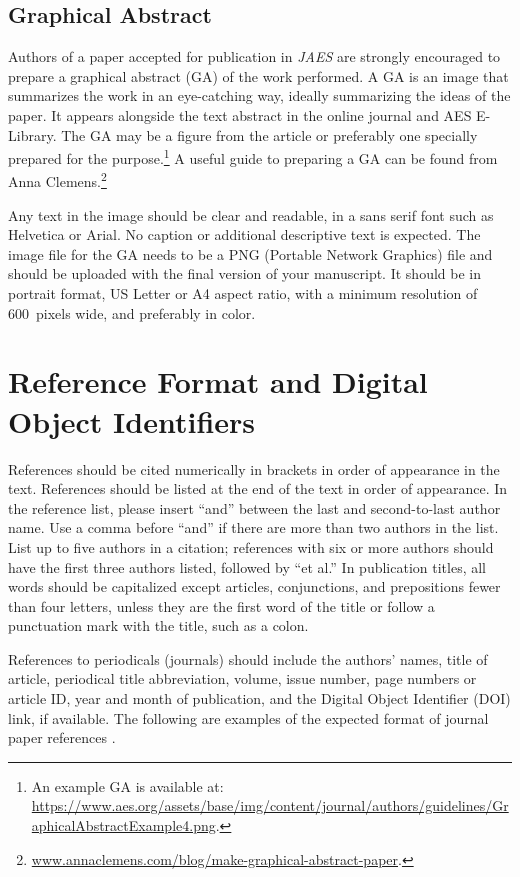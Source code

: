 \documentclass[fleqn]{jaes}
\begin{document}
\subsection{Graphical Abstract}
Authors of a paper accepted for publication in \emph{JAES} are strongly encouraged to prepare a graphical abstract (GA) of the work performed. A GA is an image that summarizes the work in an eye-catching way, ideally summarizing the ideas of the paper. It appears alongside the text abstract in the online journal and AES E-Library. The GA may be a figure from the article or preferably one specially prepared for the purpose.\footnote{An example GA is available at: \url{https://www.aes.org/assets/base/img/content/journal/authors/guidelines/GraphicalAbstractExample4.png}.} A useful guide to preparing a GA can be found from Anna Clemens.\footnote{\url{www.annaclemens.com/blog/make-graphical-abstract-paper}.}

Any text in the image should be clear and readable, in a sans serif font such as Helvetica or Arial. No caption or additional descriptive text is expected. The image file for the GA needs to be a PNG (Portable Network Graphics) file and should be uploaded with the final version of your manuscript. It should be in portrait format, US Letter or A4 aspect ratio, with a minimum resolution of 600~pixels wide, and preferably in color.

\section{Reference Format and Digital Object Identifiers}\label{sec:refs}
References should be cited numerically in brackets in order of appearance in the text. References should be listed at the end of the text in order of appearance. In the reference list, please insert “and” between the last and second-to-last author name. Use a comma before “and” if there are more than two authors in the list. List up to five authors in a citation; references with six or more authors should have the first three authors listed, followed by ``et al.''  
In publication titles, all words should be capitalized except articles, conjunctions, and prepositions fewer than four letters, unless they are the first word of the title or follow a punctuation mark with the title, such as a colon. %

References to periodicals (journals) should include the authors’ names, title of article, periodical title abbreviation, volume, issue number, page numbers or article ID, year and month of publication, and the Digital Object Identifier (DOI) link, if available. The following are examples of the expected format of journal paper references \cite{a_journal_paper, a_journal_paper_with_many_authors, a_journal_paper_with_article_ID}.
\end{document}
